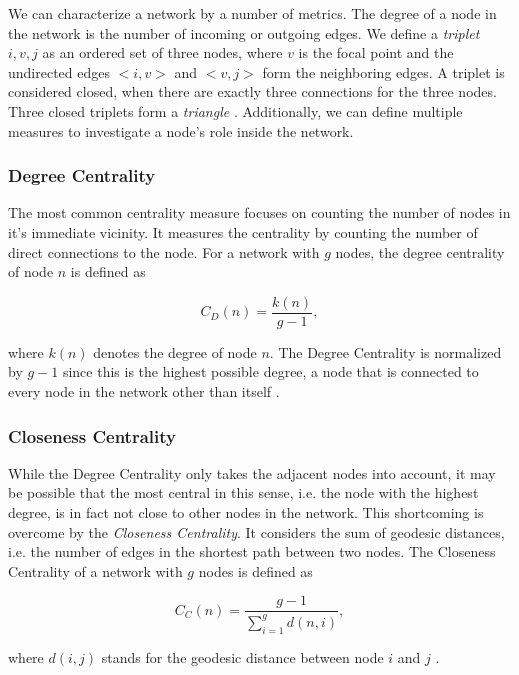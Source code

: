 We can characterize a network by a number of metrics. The degree of a node in the network is the number of incoming or outgoing edges. We define a \emph{triplet} $i, v, j$ as an ordered set of three nodes, where $v$ is the focal point and the undirected edges $<i, v>$ and $<v, j>$ form the neighboring edges. A triplet is considered closed, when there are exactly three connections for the three nodes. Three closed triplets form a \emph{triangle} \cite{graphintro}. Additionally, we can define multiple measures to investigate a node's role inside the network.

\subsubsection{Degree Centrality}

The most common centrality measure focuses on counting the number of nodes in it's immediate vicinity. It measures the centrality by counting the number of direct connections to the node. For a network with $g$ nodes, the degree centrality of node $n$ is defined as

\begin{equation}
C_D(n) = \frac{k(n)}{g-1},
\end{equation}

where $k(n)$ denotes the degree of node $n$. The Degree Centrality is normalized by $g-1$ since this is the highest possible degree, a node that is connected to every node in the network other than itself \cite{graphintro}.

\subsubsection{Closeness Centrality}

While the Degree Centrality only takes the adjacent nodes into account, it may be possible that the most central in this sense, i.e. the node with the highest degree, is in fact not close to other nodes in the network. This shortcoming is overcome by the \emph{Closeness Centrality}. It considers the sum of geodesic distances, i.e. the number of edges in the shortest path between two nodes. The Closeness Centrality of a network with $g$ nodes is defined as 

\begin{equation}
C_C(n) = \frac{g - 1}{\sum\limits_{i=1}^g d(n, i)},
\label{closeness}
\end{equation}

where $d(i, j)$ stands for the geodesic distance between node $i$ and $j$ \cite{graphintro}.

